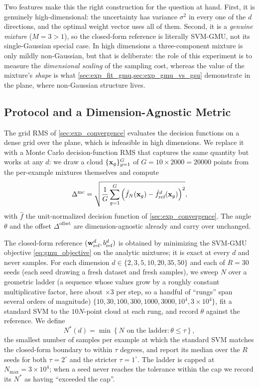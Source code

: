 \documentclass[11pt, letterpaper]{article}
\begin{document}
Two features make this the right construction for the question at hand. First, it is genuinely high-dimensional: the uncertainty has variance $\sigma^2$ in every one of the $d$ directions, and the optimal weight vector uses all of them. Second, it is a \emph{genuine mixture} ($M = 3 > 1$), so the closed-form reference is literally SVM-GMU, not its single-Gaussian special case. In high dimensions a three-component mixture is only mildly non-Gaussian, but that is deliberate: the role of this experiment is to measure the \emph{dimensional scaling} of the sampling cost, whereas the value of the mixture's \emph{shape} is what \cref{sec:exp_fit_gmu,sec:exp_gmu_vs_gsu} demonstrate in the plane, where non-Gaussian structure lives.

\subsection{Protocol and a Dimension-Agnostic Metric}\label{sec:exp_high_dim_protocol}

The grid RMS of \cref{sec:exp_convergence} evaluates the decision functions on a dense grid over the plane, which is infeasible in high dimensions. We replace it with a Monte Carlo decision-function RMS that captures the same quantity but works at any $d$: we draw a cloud $\{\vb{x}_g\}_{g=1}^{G}$ of $G = 10 \times 2000 = 20000$ points from the per-example mixtures themselves and compute
\begin{equation}\label{eq:exp_mc_rms}
    \Delta^{\text{mc}} = \sqrt{\frac{1}{G}\sum_{g=1}^{G}\left(\hat{f}_N(\vb{x}_g) - \hat{f}_{\text{ref}}^d(\vb{x}_g)\right)^2},
\end{equation}
with $\hat{f}$ the unit-normalized decision function of \cref{sec:exp_convergence}. The angle $\theta$ and the offset $\Delta^{\text{offset}}$ are dimension-agnostic already and carry over unchanged.

The closed-form reference $(\vb{w}_{\text{ref}}^d, b_{\text{ref}}^d)$ is obtained by minimizing the SVM-GMU objective \cref{eq:gmu_objective} on the analytic mixtures; it is exact at every $d$ and never samples. For each dimension $d \in \{2, 3, 5, 10, 20, 35, 50\}$ and each of $R = 30$ seeds (each seed drawing a fresh dataset and fresh samples), we sweep $N$ over a geometric ladder (a sequence whose values grow by a roughly constant multiplicative factor, here about $\times 3$ per step, so a handful of ``rungs'' span several orders of magnitude) $\{10, 30, 100, 300, 1000, 3000, 10^4, 3\times10^4\}$, fit a standard SVM to the $10N$-point cloud at each rung, and record $\theta$ against the reference. We define
\begin{equation}\label{eq:exp_nstar}
    N^\ast(d) = \min\left\{ N \text{ on the ladder} : \theta \le \tau \right\},
\end{equation}
the smallest number of samples per example at which the standard SVM matches the closed-form boundary to within $\tau$ degrees, and report its median over the $R$ seeds for both $\tau = 2^\circ$ and the stricter $\tau = 1^\circ$. The ladder is capped at $N_{\max} = 3\times10^4$; when a seed never reaches the tolerance within the cap we record its $N^\ast$ as having ``exceeded the cap''.
\end{document}
